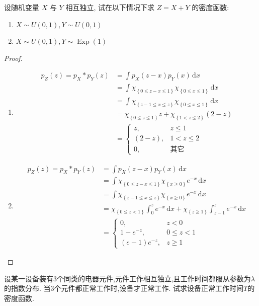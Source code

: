 \documentclass[../main.tex]{subfiles}
\begin{document}
\begin{exercise}{}{}
设随机变量 $X$ 与 $Y$ 相互独立, 试在以下情况下求 $Z = X + Y$ 的密度函数:
\begin{enumerate}
\item $X \sim U(0,1), Y \sim U(0,1)$
\item $X \sim U(0,1), Y \sim \operatorname{Exp}(1)$
\end{enumerate}
\end{exercise}
\begin{proof}
    \begin{enumerate}
        \item \[
       \begin{aligned}
        p_{Z}\left( z \right)= p_{X}*p_{Y}\left( z \right)&= \int p_{X}\left( z-x \right)p_{Y}\left( x \right)\,\mathrm{d} x \\ 
         &= \int \chi _{\left\{ 0\le z-x\le 1 \right\}}\chi _{\left\{ 0\le x\le 1 \right\}}\,\mathrm{d} x\\ 
          &=  \int  \chi _{\left\{ z-1\le x\le z \right\}}\chi _{\left\{ 0\le x\le 1 \right\}}\,\mathrm{d} x\\ 
           &= \chi _{\left\{0\le  z\le 1 \right\}}z+ \chi _{\left\{ 1< z\le 2 \right\}}\left( 2-z \right) \\ 
            &= \begin{cases} z,& z\le 1\\ 
             \left( 2-z \right),& 1< z\le 2\\ 
              0,& \text{其它} \end{cases} 
       \end{aligned}    
        \]
        \item \[
      \begin{aligned}
        p_{Z}\left( z \right)= p_{X}*p_{Y}\left( z \right)&= \int {p_{X}}\left( z-x \right)p_{Y}\left( x \right)\,\mathrm{d} x\\ 
         &=  \int \chi _{\left\{ 0\le z-x\le 1 \right\}}\chi _{\left\{ x\ge 0 \right\}}e^{-x}\,\mathrm{d} x\\ 
          &= \int \chi _{\left\{ z-1\le x\le z \right\}}\chi _{\left\{ x\ge 0 \right\}}e^{-x}\,\mathrm{d} x\\ 
           &= \chi _{\left\{ 0\le z< 1\right\}} \int_{0}^{z}e^{-x}\,\mathrm{d} x+ \chi _{\left\{ z\ge 1 \right\}}\int_{z-1}^{z}e^{-x}\,\mathrm{d} x\\ 
            &= \begin{cases} 0,&z< 0\\ 
             1-e^{-z},& 0\le z< 1\\ 
            \left( e-1 \right)e^{-z} ,& z\ge 1 \end{cases} 
      \end{aligned}    
        \]
    \end{enumerate}
    
\end{proof}
\begin{exercise}{}{}
设某一设备装有3个同类的电器元件,元件工作相互独立,且工作时间都服从参数为\(\lambda\)的指数分布. 当3个元件都正常工作时,设备才正常工作. 试求设备正常工作时间\(T\)的密度函数.
\end{exercise}
\end{document}

